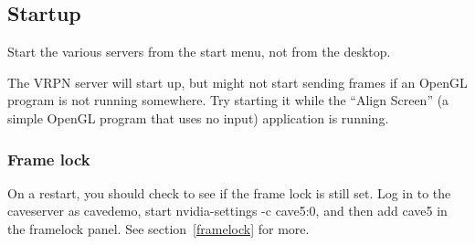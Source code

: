 \documentclass[11pt]{article}
\begin{document}
\subsection{Startup}


Start the various servers from the start menu, not from the desktop.

The VRPN server will start up, but might not start sending frames if
an OpenGL program is not running somewhere.  Try starting it while the
``Align Screen'' (a simple OpenGL program that uses no input)
application is running.


\subsubsection{Frame lock}

On a restart, you should check to see if the frame lock is still set.
Log in to the caveserver as cavedemo, start nvidia-settings -c
cave5:0, and then add cave5 in the framelock panel.   See
  section~\ref{framelock} for more.
\end{document}
